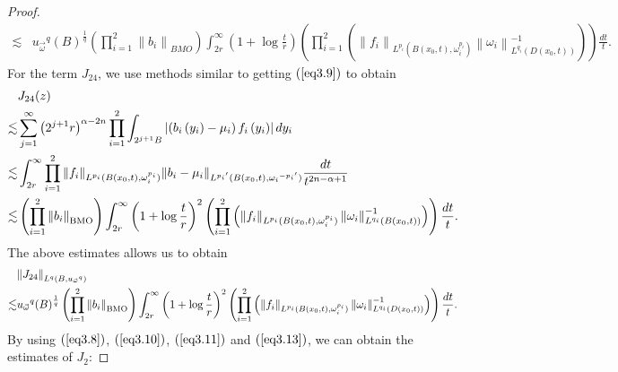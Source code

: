 \documentclass[11pt, twoside, leqno]{article}
\begin{document}
\begin{proof}[Proof]
\begin{align}
	\lesssim&{u_{\vec \omega }}^q{\left( B \right)^{\frac{1}{q}}}\left( {\prod\limits_{i = 1}^2 {{{\left\| {{b_i}} \right\|}_{BMO}}} } \right)\int_{2r}^\infty  {\left( {1 + \log \frac{t}{r}} \right)\left( {\prod\limits_{i = 1}^2 {\left( {{{\left\| {{f_i}} \right\|}_{{L^{{p_i}}}(B\left( {{x_0},t} \right),\omega _i^{{p_i}})}}\left\| {{\omega _i}} \right\|_{{L^{{q_i}}}(D\left( {{x_0},t} \right))}^{ - 1}} \right)} } \right)\frac{{dt}}{t}}.
	\end{align}
	For the term ${J_{24}}$, we use methods similar to getting $(\ref{eq3.9})$ to obtain
	\begin{align}\label{eq3.12}
	&{{J_{24}}}(z)\notag\\ 
	\lesssim&\sum\limits_{j = 1}^\infty  {{{\left( {{2^{j + 1}}r} \right)}^{\alpha  - 2n}}\prod\limits_{i = 1}^2 {\int_{{2^{j + 1}}B} {\left| {\left( {{b_i}\left( {{y_i}} \right) - {\mu _i}} \right){f_i}\left( {{y_i}} \right)} \right|d{y_i}} } }\notag\\ 
	\lesssim& \int_{2r}^\infty  {\prod\limits_{i = 1}^2 {{{\left\| {{f_i}} \right\|}_{{L^{{p_i}}}(B\left( {{x_0},t} \right),\omega _i^{{p_i}})}}} {{\left\| {{b_i} - {\mu _i}} \right\|}_{{L^{{p_i}^\prime }}(B\left( {{x_0},t} \right),{\omega _i}^{ - {p_i}^\prime })}}\frac{{dt}}{{{t^{2n - \alpha  + 1}}}}}\notag\\
	\lesssim&\left( {\prod\limits_{i = 1}^2 {{{\left\| {{b_i}} \right\|}_{\rm BMO}}} } \right)\int_{2r}^\infty  {{{\left( {1 + \log \frac{t}{r}} \right)}^2}\left( {\prod\limits_{i = 1}^2 {\left( {{{\left\| {{f_i}} \right\|}_{{L^{{p_i}}}(B\left( {{x_0},t} \right),\omega _i^{{p_i}})}}\left\| {{\omega _i}} \right\|_{{L^{{q_i}}}(B\left( {{x_0},t} \right))}^{ - 1}} \right)} } \right)\frac{{dt}}{t}}.
	\end{align}
	The above estimates allows us to obtain
	\begin{align}\label{eq3.13}
	&{\left\| {{J_{24}}} \right\|_{{L^q}\left( {B,{u_{\vec \omega }}^q} \right)}}\notag\\
	\lesssim&{u_{\vec \omega }}^q{\left( B \right)^{\frac{1}{q}}}\left( {\prod\limits_{i = 1}^2 {{{\left\| {{b_i}} \right\|}_{\rm BMO}}} } \right)\int_{2r}^\infty  {{{\left( {1 + \log \frac{t}{r}} \right)}^2}\left( {\prod\limits_{i = 1}^2 {\left( {{{\left\| {{f_i}} \right\|}_{{L^{{p_i}}}(B\left( {{x_0},t} \right),\omega _i^{{p_i}})}}\left\| {{\omega _i}} \right\|_{{L^{{q_i}}}(D\left( {{x_0},t} \right))}^{ - 1}} \right)} } \right)\frac{{dt}}{t}}.
	\end{align}
	By using $(\ref{eq3.8})$, $(\ref{eq3.10})$, $(\ref{eq3.11})$ and $(\ref{eq3.13})$, we can obtain the estimates of $J_{2}$:

\end{proof}
\end{document}
